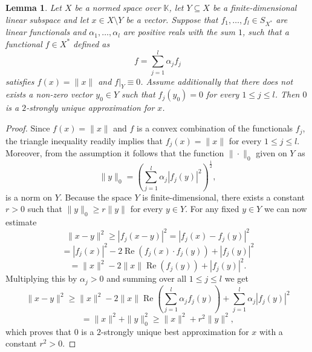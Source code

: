 \documentclass[12pt, reqno]{amsart}
\newtheorem{lem}[twr]{Lemma}
\theoremstyle{definition}
\theoremstyle{remark}
\numberwithin{equation}{section}
\DeclareMathOperator{\re}{Re}
\begin{document}
\begin{lem}
\label{lem2strong}
Let $X$ be a normed space over $\mathbb{K}$, let $Y \subseteq X$ be a finite-dimensional linear subspace and let $x \in X \setminus Y$ be a vector. Suppose that $f_1, \ldots, f_l \in S_{X^*}$ are linear functionals and $\alpha_1, \ldots, \alpha_l$ are positive reals with the sum $1$, such that a functional $f \in X^*$ defined as
$$f =\sum_{j=1}^{l} \alpha_jf_j$$
satisfies $f(x)=\|x\|$ and $f|_Y \equiv 0$. Assume additionally that there does not exists a non-zero vector $y_0 \in Y$ such that $f_j(y_0)=0$ for every $1 \leq j \leq l$. Then $0$ is a $2$-strongly unique approximation for $x$.
\end{lem}
\begin{proof}
Since $f(x)=\|x\|$ and $f$ is a convex combination of the functionals $f_j$, the triangle inequality readily implies that $f_j(x)=\|x\|$ for every $1 \leq j \leq l$. Moreover, from the assumption it follows that the function $\| \cdot \|_0$ given on $Y$ as
$$\|y\|_0 = \left ( \sum_{j=1}^{l} \alpha_j |f_j(y)|^2 \right )^{\frac{1}{2}},$$
is a norm on $Y$. Because the space $Y$ is finite-dimensional, there exists a constant $r>0$ such that $\|y\|_0 \geq r\|y\|$ for every $y \in Y$. For any fixed $y \in Y$ we can now estimate
$$\|x-y\|^2 \geq |f_j(x-y)|^2= |f_j(x) - f_j(y)|^2$$
$$=|f_j(x)|^2 - 2\re(f_j(x) \cdot f_j(y)) + |f_j(y)|^2$$
$$=\|x\|^2 - 2\|x\|\re(f_j(y)) + |f_j(y)|^2.$$
Multiplying this by $\alpha_j>0$ and summing over all $1 \leq j \leq l$ we get
$$\|x-y\|^2 \geq \|x\|^2 - 2 \|x\| \re \left ( \sum_{j=1}^{l} \alpha_j f_j(y) \right ) + \sum_{j=1}^{l} \alpha_j |f_j(y)|^2$$
$$=\|x\|^2 + \|y\|_0^2 \geq \|x\|^2 + r^2\|y\|^2,$$
which proves that $0$ is a $2$-strongly unique best approximation for $x$ with a constant $r^2>0$.

\end{proof}
\end{document}
